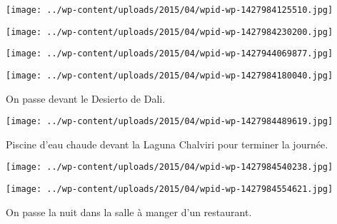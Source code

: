  

\begin{center} \texttt{[image: ../wp-content/uploads/2015/04/wpid-wp-1427984125510.jpg]} \end{center}



 

\begin{center} \texttt{[image: ../wp-content/uploads/2015/04/wpid-wp-1427984230200.jpg]} \end{center}



 

\begin{center} \texttt{[image: ../wp-content/uploads/2015/04/wpid-wp-1427944069877.jpg]} \end{center}



 

\begin{center} \texttt{[image: ../wp-content/uploads/2015/04/wpid-wp-1427984180040.jpg]} \end{center}



 On passe devant le Desierto de Dali.

 

\begin{center} \texttt{[image: ../wp-content/uploads/2015/04/wpid-wp-1427984489619.jpg]} \end{center}



 Piscine d'eau chaude devant la Laguna Chalviri pour terminer la journée.

 

\begin{center} \texttt{[image: ../wp-content/uploads/2015/04/wpid-wp-1427984540238.jpg]} \end{center}



 

\begin{center} \texttt{[image: ../wp-content/uploads/2015/04/wpid-wp-1427984554621.jpg]} \end{center}



 On passe la nuit dans la salle à manger d'un restaurant.

 

